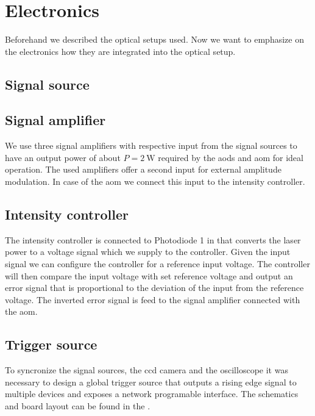 \section{Electronics}

Beforehand we described the optical setups used. Now we want to emphasize
on the electronics how they are integrated into the optical setup.

\subsection{Signal source}\label{subsec:setup_signal_source}

\subsection{Signal amplifier}

We use three signal amplifiers with respective input from the signal sources
to have an output power of about $P=\SI{2}{\watt}$ required by the \gls{aod}s
and \gls{aom} for ideal operation. The used amplifiers offer a second input
for external amplitude modulation. In case of the \gls{aom} we connect this
input to the intensity controller.

\subsection{Intensity controller}

The intensity controller is connected to Photodiode 1 in
 that converts the laser power to a voltage
signal which we supply to the controller. Given the input signal we can
configure the controller for a reference input voltage. The controller will
then compare the input voltage with set reference voltage and output an error
signal that is proportional to the deviation of the input from the reference
voltage. The inverted error signal is feed to the signal amplifier connected
with the \gls{aom}.

\subsection{Trigger source}

To syncronize the signal sources, the \gls{ccd} camera and the oscilloscope
it was necessary to design a global trigger source that outputs a rising edge
signal to multiple devices and exposes a network programable interface.
The schematics and board layout can be found in the
.

